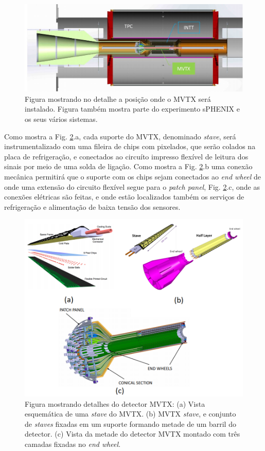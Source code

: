 \begin{figure} 
    \centering
    \includegraphics[width=15.0cm]{assets/mvtx.JPG}
    \caption{ Figura mostrando no detalhe a posição onde o MVTX será instalado. Figura também mostra parte do experimento sPHENIX e os seus vários sistemas.}
    \label{mvtx}
\end{figure}

Como mostra a Fig. \ref{mvtxdetail}.a, cada suporte do MVTX, denominado \textit{stave}, será instrumentalizado com uma fileira de chips com pixelados, que serão colados na placa de refrigeração, e conectados ao circuíto impresso flexível de leitura dos sinais por meio de uma solda de ligação. Como mostra a Fig. \ref{mvtxdetail}.b uma conexão mecânica permitirá que o suporte com os chips sejam conectados ao \textit{end wheel} de onde uma extensão do circuito flexível segue para o \textit{patch panel}, Fig. \ref{mvtxdetail}.c, onde as conexões elétricas são feitas, e onde estão localizados também os serviços de refrigeração e alimentação de baixa tensão dos sensores.

\begin{figure} 
    \centering
    \includegraphics[width=16.0cm]{assets/mvtx_detail.JPG}
    \caption{Figura mostrando detalhes do detector MVTX: (a) Vista esquemática de uma \textit{stave} do MVTX. (b) MVTX \textit{stave}, e conjunto de \textit{staves} fixadas em um suporte formando metade de um barril do detector. (c) Vista da metade do detector MVTX montado com três camadas fixadas no \textit{end wheel}.}
    \label{mvtxdetail}
\end{figure}

\renewcommand{\cleardoublepage}{}
\renewcommand{\clearpage}{}